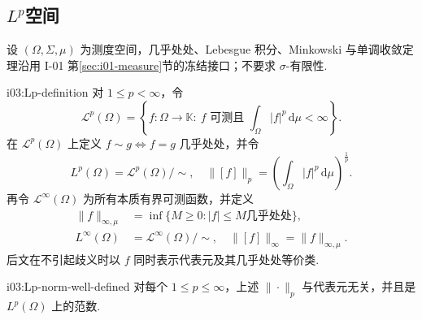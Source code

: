 \subsection{\texorpdfstring{\(\displaystyle L^p\)}{L^p}空间}

设 \(\displaystyle (\Omega,\Sigma,\mu)\) 为测度空间，几乎处处、Lebesgue 积分、Minkowski 与单调收敛定理沿用 I-01 第\ref{sec:i01-measure}节的冻结接口；不要求 \(\displaystyle \sigma\)-有限性.

\begin{FADefinition}[B][\(\displaystyle L^p\)空间]{i03:Lp-definition}
对 \(\displaystyle 1\leqslant p<\infty\)，令
\[
\mathcal L^p(\Omega)
=\left\{f:\Omega\to\mathbb K:\ f\text{ 可测且 }\int_\Omega|f|^p\,\mathrm{d}\mu<\infty\right\}.
\]
在 \(\displaystyle \mathcal L^p(\Omega)\) 上定义 \(\displaystyle f\sim g\iff f=g\) 几乎处处，并令
\[
L^p(\Omega)=\mathcal L^p(\Omega)/\!\sim,
\quad
\|[f]\|_p=\left(\int_\Omega|f|^p\,\mathrm{d}\mu\right)^{\frac{1}{p}}.
\]
再令 \(\displaystyle \mathcal L^\infty(\Omega)\) 为所有本质有界可测函数，并定义
\[
\begin{aligned}
\|f\|_{\infty,\mu}&=\inf\{M\geqslant0:|f|\leqslant M\text{几乎处处}\},\\
L^\infty(\Omega)&=\mathcal L^\infty(\Omega)/\!\sim,\quad \|[f]\|_\infty=\|f\|_{\infty,\mu}.
\end{aligned}
\]
后文在不引起歧义时以 \(\displaystyle f\) 同时表示代表元及其几乎处处等价类.
\end{FADefinition}

\begin{FAProposition}{i03:Lp-norm-well-defined}
对每个 \(\displaystyle 1\leqslant p\leqslant\infty\)，上述 \(\displaystyle \|\cdot\|_p\) 与代表元无关，并且是 \(\displaystyle L^p(\Omega)\) 上的范数.
\end{FAProposition}

